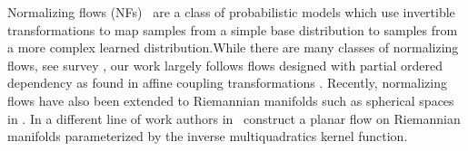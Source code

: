 Normalizing flows (NFs)~\cite{rezende2015variational,dinh2016density} are a class of probabilistic models which use invertible transformations to map samples from a simple base distribution to samples from a more complex learned distribution.While there are many classes of normalizing flows, see survey \cite{papamakarios2019normalizing,kobyzev2019normalizing}, our work largely follows flows designed with partial ordered dependency as found in affine coupling transformations \cite{dinh2016density}. 
Recently, normalizing flows have also been extended to Riemannian manifolds such as spherical spaces in \citet{gemici2016normalizing}. In a different line of work authors in~\citet{wang-wang-2019-riemannian} construct a planar flow  \cite{rezende2015variational} on Riemannian manifolds parameterized by the inverse multiquadratics kernel function. %




